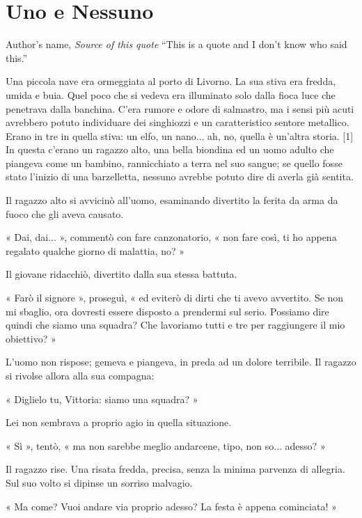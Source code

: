 \chapter{Uno e Nessuno}

\begin{chapquote}{Author's name, \textit{Source of this quote}}
``This is a quote and I don't know who said this.''
\end{chapquote}


Una piccola nave era ormeggiata al porto di Livorno. La sua stiva era fredda, umida e buia. Quel poco che si vedeva era illuminato solo dalla fioca luce che penetrava dalla banchina. C'era rumore e odore di salmastro, ma i sensi più acuti avrebbero potuto individuare dei singhiozzi e un caratteristico sentore metallico. Erano in tre in quella stiva: un elfo, un nano... ah, no, quella è un'altra storia. [1] In questa c'erano un ragazzo alto, una bella biondina ed un uomo adulto che piangeva come un bambino, rannicchiato a terra nel suo sangue; se quello fosse stato l'inizio di una barzelletta, nessuno avrebbe potuto dire di averla già sentita.

Il ragazzo alto si avvicinò all'uomo, esaminando divertito la ferita da arma da fuoco che gli aveva causato.

« Dai, dai... », commentò con fare canzonatorio, « non fare così, ti ho appena regalato qualche giorno di malattia, no? »

Il giovane ridacchiò, divertito dalla sua stessa battuta.

« Farò il signore », proseguì, « ed eviterò di dirti che ti avevo avvertito. Se non mi sbaglio, ora dovresti essere disposto a prendermi sul serio. Possiamo dire quindi che siamo una squadra? Che lavoriamo tutti e tre per raggiungere il mio obiettivo? »

L'uomo non rispose; gemeva e piangeva, in preda ad un dolore terribile. Il ragazzo si rivolse allora alla sua compagna:

« Diglielo tu, Vittoria: siamo una squadra? »

Lei non sembrava a proprio agio in quella situazione.

« Sì », tentò, « ma non sarebbe meglio andarcene, tipo, non so... adesso? »

Il ragazzo rise. Una risata fredda, precisa, senza la minima parvenza di allegria. Sul suo volto si dipinse un sorriso malvagio.

« Ma come? Vuoi andare via proprio adesso? La festa è appena cominciata! »

